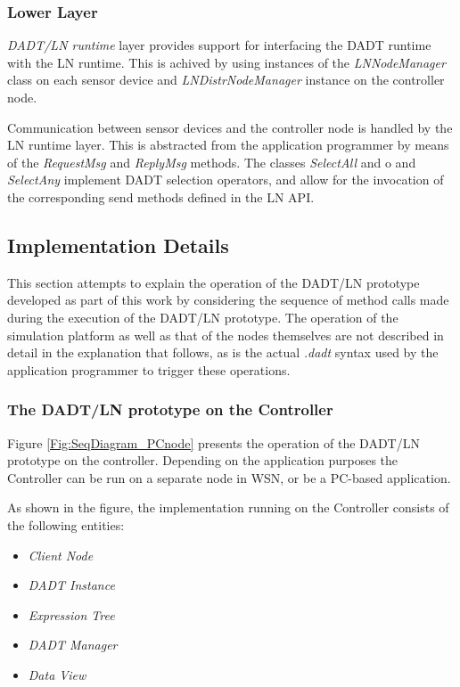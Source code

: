 \subsubsection{Lower Layer}

\emph{DADT/LN runtime} layer provides support for interfacing the DADT runtime
with the LN runtime. This is achived by using instances of the
\emph{LNNodeManager} class on each sensor device and \emph{LNDistrNodeManager}
instance on the controller node.

Communication between sensor devices and the controller node is handled by the LN
runtime layer. This is abstracted from the application programmer by means of the 
\emph{RequestMsg} and \emph{ReplyMsg} methods. The classes \emph{SelectAll} and
o and \emph{SelectAny} implement DADT selection operators, and allow for the invocation of
the corresponding send methods defined in the LN API.

\subsection{Implementation Details}

This section attempts to explain the operation of the DADT/LN prototype
developed as part of this work by considering the sequence of method calls made
during the execution of the DADT/LN prototype. The operation of the simulation platform as well as that of the
nodes themselves are not described in detail in the explanation that follows, as is the actual
\emph{.dadt} syntax used by the application programmer to trigger these
operations. 

\subsubsection{The DADT/LN prototype on the Controller}

Figure \ref{Fig:SeqDiagram_PCnode} presents the operation of the DADT/LN
prototype on the controller. 
Depending on the application purposes the Controller can be run on a separate
node in WSN, or be a PC-based application.

As shown in the figure, the implementation running on the Controller consists of
the following entities:

\begin{itemize}
  \item \emph{Client Node}
  \item \emph{DADT Instance}
  \item \emph{Expression Tree} 
  \item \emph{DADT Manager} 
  \item \emph{Data View} 
\end{itemize}

